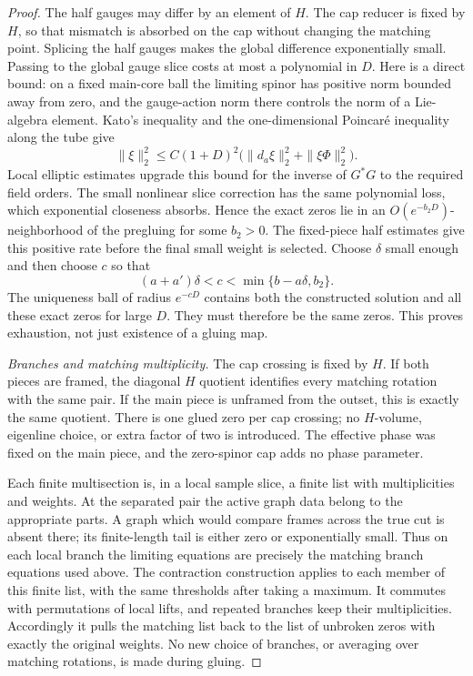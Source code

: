 \begin{proof}
The half gauges may differ by an element of $H$.  The cap reducer
is fixed by $H$, so that mismatch is absorbed on the cap without
changing the matching point.  Splicing the half gauges makes the
global difference exponentially small.  Passing to the global
gauge slice costs at most a polynomial in $D$.  Here is a direct
bound: on a fixed main-core ball the limiting spinor has positive
norm bounded away from zero, and the gauge-action norm there
controls the norm of a Lie-algebra element.  Kato's inequality
and the one-dimensional Poincar\'e inequality along the tube give
\[
 \|\xi\|_2^2\le C(1+D)^2
 \bigl(\|d_a\xi\|_2^2+\|\xi\Phi\|_2^2\bigr).
\]
Local elliptic estimates upgrade this bound for the inverse of
$G^*G$ to the required field orders.  The small nonlinear slice
correction has the same polynomial loss, which exponential
closeness absorbs.  Hence the exact zeros lie in an
$O(e^{-b_2D})$-neighborhood of the pregluing for some $b_2>0$.
The fixed-piece half estimates give this positive rate before
the final small weight is selected.  Choose $\delta$ small
enough and then choose $c$ so that
\[
 (a+a')\delta<c<\min\{b-a\delta,b_2\}.
\]
The uniqueness ball of radius $e^{-cD}$ contains both the
constructed solution and all these exact zeros for large $D$.
They must therefore be the same zeros.  This proves
exhaustion, not just existence of a gluing map.

\emph{Branches and matching multiplicity.}
The cap crossing is fixed by $H$.  If both pieces are framed,
the diagonal $H$ quotient identifies every matching rotation
with the same pair.  If the main piece is unframed from the
outset, this is exactly the same quotient.  There is one glued
zero per cap crossing; no $H$-volume, eigenline choice, or extra
factor of two is introduced.  The effective phase was fixed on
the main piece, and the zero-spinor cap adds no phase parameter.

Each finite multisection is, in a local sample slice, a finite
list with multiplicities and weights.  At the separated pair
the active graph data belong to the appropriate parts.  A graph
which would compare frames across the true cut is absent there;
its finite-length tail is either zero or exponentially small.
Thus on each local branch the limiting equations are precisely
the matching branch equations used above.  The contraction
construction applies to each member of this finite list, with
the same thresholds after taking a maximum.  It commutes with
permutations of local lifts, and repeated branches keep their
multiplicities.  Accordingly it pulls the matching list back to
the list of unbroken zeros with exactly the original weights.
No new choice of branches, or averaging over matching rotations,
is made during gluing.
\end{proof}

